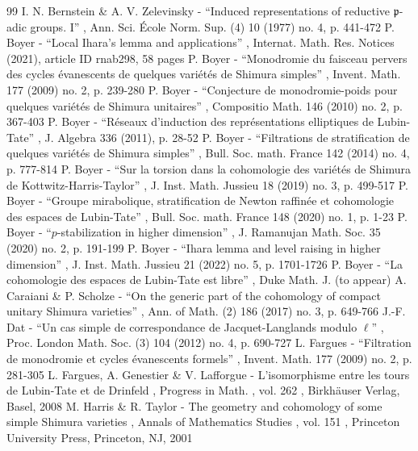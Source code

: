 \documentclass[11pt]{article}
\theoremstyle{plain}
\theoremstyle{definition}
\numberwithin{equation}{subsection}
\begin{document}
\begin{thebibliography}{99}
 I. N. Bernstein \& A. V. Zelevinsky - “Induced representations of reductive ${\mathfrak{p}}$-adic groups. I” , Ann. Sci. École Norm. Sup. (4) 10 (1977) no. 4, p. 441-472
 P. Boyer - “Local Ihara’s lemma and applications” , Internat. Math. Res. Notices (2021), article ID rnab298, 58 pages
 P. Boyer - “Monodromie du faisceau pervers des cycles évanescents de quelques variétés de Shimura simples” , Invent. Math. 177 (2009) no. 2, p. 239-280
 P. Boyer - “Conjecture de monodromie-poids pour quelques variétés de Shimura unitaires” , Compositio Math. 146 (2010) no. 2, p. 367-403
 P. Boyer - “Réseaux d’induction des représentations elliptiques de Lubin-Tate” , J. Algebra 336 (2011), p. 28-52
 P. Boyer - “Filtrations de stratification de quelques variétés de Shimura simples” , Bull. Soc. math. France 142 (2014) no. 4, p. 777-814
 P. Boyer - “Sur la torsion dans la cohomologie des variétés de Shimura de Kottwitz-Harris-Taylor” , J. Inst. Math. Jussieu 18 (2019) no. 3, p. 499-517
 P. Boyer - “Groupe mirabolique, stratification de Newton raffinée et cohomologie des espaces de Lubin-Tate” , Bull. Soc. math. France 148 (2020) no. 1, p. 1-23
 P. Boyer - “$p$-stabilization in higher dimension” , J. Ramanujan Math. Soc. 35 (2020) no. 2, p. 191-199
 P. Boyer - “Ihara lemma and level raising in higher dimension” , J. Inst. Math. Jussieu 21 (2022) no. 5, p. 1701-1726
 P. Boyer - “La cohomologie des espaces de Lubin-Tate est libre” , Duke Math. J. (to appear)
 A. Caraiani \& P. Scholze - “On the generic part of the cohomology of compact unitary Shimura varieties” , Ann. of Math. (2) 186 (2017) no. 3, p. 649-766
 J.-F. Dat - “Un cas simple de correspondance de Jacquet-Langlands modulo $\ell $” , Proc. London Math. Soc. (3) 104 (2012) no. 4, p. 690-727
 L. Fargues - “Filtration de monodromie et cycles évanescents formels” , Invent. Math. 177 (2009) no. 2, p. 281-305
 L. Fargues, A. Genestier \& V. Lafforgue - L’isomorphisme entre les tours de Lubin-Tate et de Drinfeld , Progress in Math. , vol. 262 , Birkhäuser Verlag, Basel, 2008
 M. Harris \& R. Taylor - The geometry and cohomology of some simple Shimura varieties , Annals of Mathematics Studies , vol. 151 , Princeton University Press, Princeton, NJ, 2001

\end{thebibliography}
\end{document}
